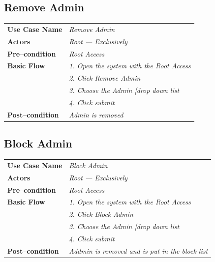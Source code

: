 \documentclass{article}
\begin{document}
\subsection{Remove Admin}
    \begin{tabular}{ l | l }
    \toprule
      \rowcolor{LightCyan}
      \textbf{Use Case Name}    & \textit{Remove Admin}\\
      \textbf{Actors}           & \textit{Root --- Exclusively}\\
      \rowcolor{LightCyan}
      \textbf{Pre--condition}   & \textit{Root Access}\\
      \textbf{Basic Flow}       & \textit{1. Open the system with the Root Access}\\
                                & \textit{2. Click Remove Admin}\\
                                & \textit{3. Choose the Admin [drop down list}\\
                                & \textit{4. Click submit}\\
      \rowcolor{LightCyan}
      \textbf{Post--condition}  & \textit{Admin is removed}\\
    \toprule
    \end{tabular}





\subsection{Block Admin}
    \begin{tabular}{ l | l }
    \toprule
      \rowcolor{LightCyan}
      \textbf{Use Case Name}    & \textit{Block Admin}\\
      \textbf{Actors}           & \textit{Root --- Exclusively}\\
      \rowcolor{LightCyan}
      \textbf{Pre--condition}   & \textit{Root Access}\\
      \textbf{Basic Flow}       & \textit{1. Open the system with the Root Access}\\
                                & \textit{2. Click Block Admin}\\
                                & \textit{3. Choose the Admin [drop down list}\\
                                & \textit{4. Click submit}\\
      \rowcolor{LightCyan}
      \textbf{Post--condition}  & \textit{Addmin is removed and is put in the block list}\\
    \toprule
    \end{tabular}
\end{document}
